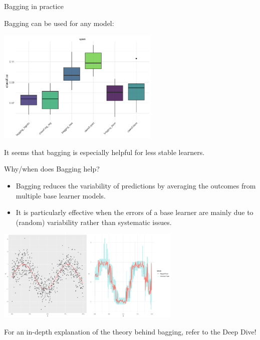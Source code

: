 \documentclass[11pt,compress,t,notes=noshow, xcolor=table]{beamer}
\begin{document}
\begin{vbframe}{Bagging in practice}

Bagging can be used for any model:

\vspace{2em}

\includegraphics[width=220pt]{figure/bagging-bench.png}

\vspace{1em}

It seems that bagging is especially helpful for less stable learners.

\end{vbframe}


\begin{vbframe}{Why/when does Bagging help?}

\begin{itemize}
  \item Bagging reduces the variability of predictions by averaging the outcomes from multiple base learner models.

  \item It is particularly effective when the errors of a base learner are mainly due to (random) variability rather than systematic issues.
\end{itemize}

\begin{center}
\includegraphics[width=250pt]{figure/bagging-mean.png}
\end{center}

\footnotesize{For an in-depth explanation of the theory behind bagging, refer to the Deep Dive!}

\end{vbframe}
\end{document}
